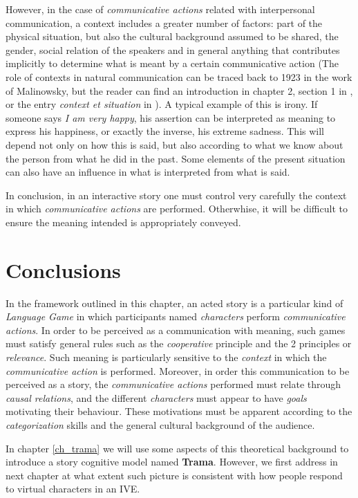 \documentclass[
		twoside,openright,titlepage,numbers=noenddot,manychapters,
		headinclude,%
                footinclude=false,cleardoublepage=empty,
                BCOR=5mm,
		fontsize=11pt, %
                 enabledeprecatedfontcommands]{scrreprt}
\begin{document}
However, in the case of  \emph{communicative actions} related with interpersonal communication, a context includes a greater number of factors: 
  part of the physical situation, but also the cultural background assumed to be shared, the gender, social relation of the speakers and in general anything that contributes implicitly to determine what is meant by a certain communicative action (The role of  contexts in natural communication can be traced back to 1923 in the work of Malinowsky, but the reader can find an introduction in chapter 2, section 1 in \cite{kramsch1993cac}, or  the entry \emph{context et situation}  in \cite{houde1998vsc}).
 A typical example of this is irony. If someone says \emph{I am very happy}, his assertion can be interpreted as meaning to express his happiness, or exactly the inverse, his extreme sadness. This will depend not only on how this is said, but also according to what we know about the person from what he did in the past. Some elements of the present situation can also have an influence in what is interpreted from what is said. 

In conclusion, in an interactive story one must control very carefully the context in which \emph{communicative actions} are performed. Otherwhise, it will be difficult to ensure the meaning intended is appropriately conveyed.



\section{Conclusions}

In the framework outlined in this chapter, an acted story is a particular kind of \emph{Language Game} in which participants named \emph{characters} perform \emph{communicative actions}. In order to be perceived as a communication with meaning, such games must satisfy general rules such as the \emph{cooperative} principle and the 2 principles or \emph{relevance}. Such meaning is particularly sensitive to the \emph{context} in which the \emph{communicative action} is performed. Moreover, in order this communication to be perceived as a story, the \emph{communicative actions} performed must relate through \emph{causal relations}, and the different \emph{characters} must appear to have \emph{goals} motivating their behaviour. These motivations must be apparent according to the \emph{categorization} skills and the general cultural background of the audience. 

In chapter  \ref{ch_trama}  we will use some aspects of this theoretical background to introduce a story cognitive model named \textbf{Trama}. However, we first address in next chapter at what extent such picture is consistent with how people respond to virtual characters in an IVE. 
\end{document}
